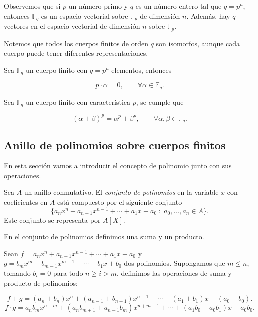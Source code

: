 Observemos que si $p$ un número primo y $q$ es un número entero tal que $q = p^n$, entonces $\mathbb{F}_q$ es un espacio vectorial sobre $\mathbb{F}_p$ de dimensión $n$. Además, hay $q$ vectores en el espacio vectorial de dimensión $n$ sobre $\mathbb{F}_p$.

Notemos que todos los cuerpos finitos de orden $q$ son isomorfos, aunque cada cuerpo puede tener diferentes representaciones.

\begin{proposition}
    Sea $\mathbb{F}_q$ un cuerpo finito con $q = p^n$ elementos, entonces 

    $$p \cdot \alpha = 0, \qquad \forall \alpha \in \mathbb{F}_q.$$
\end{proposition}

\begin{proposition}
    Sea $\mathbb{F}_q$ un cuerpo finito con característica $p$, se cumple que

    $$( \alpha + \beta )^p = \alpha^p + \beta^p, \qquad \forall \alpha, \beta \in \mathbb{F}_q.$$
\end{proposition}


\subsection{Anillo de polinomios sobre cuerpos finitos}

En esta sección vamos a introducir el concepto de polinomio junto con sus operaciones.

\begin{definition}
    Sea $A$ un anillo conmutativo. El \emph{conjunto de polinomios} en la variable $x$ con coeficientes en $A$ está compuesto por el siguiente conjunto
    $$\{ a_n x^n  + a_{n-1} x^{n-1} + \cdots + a_1 x + a_0 \; : \; a_0, ..., a_n \in A \}.$$
    Este conjunto se representa por $A[X]$.
\end{definition}

En el conjunto de polinomios definimos una suma y un producto. 

Sean $f = a_n x^n + a_{n-1} x^{n-1} + \cdots + a_1 x + a_0$ y $g = b_m x^m + b_{m-1} x^{m-1} + \cdots + b_1 x + b_0$ dos polinomios. Supongamos que $m \leq n$, tomando $b_i = 0$ para todo $n \geq i > m$, definimos las operaciones de suma y producto de polinomios:

$$f + g = (a_n + b_n)x^n + (a_{n-1} + b_{n-1})x^{n-1} + \cdots + (a_1 + b_1)x + (a_0 + b_0).$$
$$f \cdot g = a_n b_m x^{n+m} + (a_n b_{m+1} + a_{n-1} b_m) x^{n+m-1} + \cdots + (a_1 b_0 + a_0 b_1)x + a_0 b_0.$$

